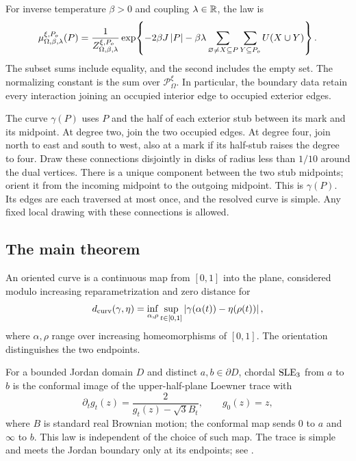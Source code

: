 For inverse temperature \(\beta>0\) and coupling \(\lambda\in\mathbb R\), the law is
\begin{equation}\label{eq:contour-law}
 \mu_{\Omega,\beta,\lambda}^{\xi,P_o}(P)
 =
 \frac{1}{Z_{\Omega,\beta,\lambda}^{\xi,P_o}}
 \exp\!\left\{
 -2\beta J\left|P\right|
 -\beta\lambda
 \sum_{\varnothing\ne X\subseteq P}
 \sum_{Y\subseteq P_o} U(X\cup Y)
 \right\}.
\end{equation}
The subset sums include equality, and the second includes the empty set.
The normalizing constant is the sum over
\(\mathcal P_\Omega^\xi\). In particular, the boundary data retain every
interaction joining an occupied interior edge to occupied exterior edges.

The curve \(\gamma(P)\) uses \(P\) and the half of each exterior stub
between its mark and its midpoint. At degree two, join the two occupied
edges. At degree four, join north to east and south to west, also at a
mark if its half-stub raises the degree to four. Draw these connections
disjointly in disks of radius less than \(1/10\) around the dual vertices.
There is a unique component between the two stub midpoints; orient it
from the incoming midpoint to the outgoing midpoint. This is
\(\gamma(P)\). Its edges are each traversed at most once, and the resolved
curve is simple. Any fixed local drawing with these connections is allowed.

\subsection{The main theorem}

An oriented curve is a continuous map from \([0,1]\) into the plane,
considered modulo increasing reparametrization and zero distance for
\begin{equation}\label{eq:curve-metric}
 d_{\rm curv}(\gamma,\eta)
 =
 \inf_{\alpha,\rho}
 \sup_{t\in[0,1]}
 \left|\gamma(\alpha(t))-\eta(\rho(t))\right|,
\end{equation}
where \(\alpha,\rho\) range over increasing homeomorphisms of \([0,1]\).
The orientation distinguishes the two endpoints.

For a bounded Jordan domain \(D\) and distinct \(a,b\in\partial D\),
chordal \(\operatorname{SLE}_3\) from \(a\) to \(b\) is the conformal image of the
upper-half-plane Loewner trace with
\[
 \partial_t g_t(z)=\frac{2}{g_t(z)-\sqrt3 B_t},
 \qquad g_0(z)=z,
\]
where \(B\) is standard real Brownian motion; the conformal map sends
\(0\) to \(a\) and \(\infty\) to \(b\). This law is independent of the
choice of such map. The trace is simple and meets the Jordan boundary
only at its endpoints; see \citet{Schramm2000,RS2005}.

